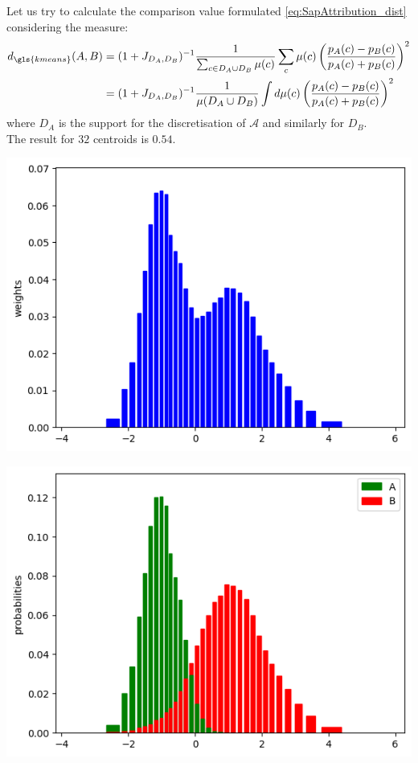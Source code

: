 \begin{exempli_gratia}
\begin{modified}
	\noindent Let us try to calculate the comparison value formulated \cref{eq:SapAttribution_dist} considering the measure:
	\begin{align*}
		d_{\gls{kmeans}}(A,B)&=(1+J_{D_A,D_B})^{-1}\frac{1}{\sum_{c\in D_A\cup D_B}\mu(c)}\sum_c \mu(c)\left(\frac{p_A(c)-p_B(c)}{p_A(c)+p_B(c)}\right)^2 \\
		&= (1+J_{D_A,D_B})^{-1}\frac{1}{\mu(D_A\cup D_B)}\int d\mu(c) \left(\frac{p_A(c)-p_B(c)}{p_A(c)+p_B(c)}\right)^2
	\end{align*}
	where $D_A$ is the support for the discretisation of ${\mathcal{A}}$ and similarly for $D_B$.\\ The result for $32$ centroids is $0.54$.

	\begin{center}
		\begin{minipage}{0.48\textwidth}
			\centering
			\includegraphics[width=\textwidth]{Figures/fused_analysis.png}
		\end{minipage}
		\hfill
		\begin{minipage}{0.48\textwidth}
			\centering
			\includegraphics[width=\textwidth]{Figures/separated_analysis.png}
		\end{minipage}
	\end{center}
	\end{modified}

\end{exempli_gratia}
